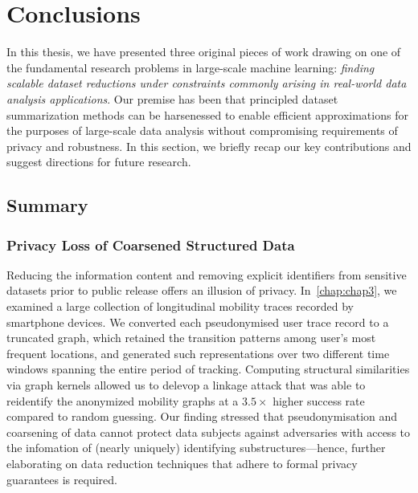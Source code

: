 \chapter{Conclusions}
\label{chap:chap6}
\renewcommand*{\MyPath}{../Chapter6}%

In this thesis, we have presented three original pieces of work drawing on one of the fundamental research problems in large-scale machine learning: \emph{finding scalable dataset reductions under constraints commonly arising in real-world data analysis applications}. Our premise has been that principled dataset summarization methods can be harsenessed to enable efficient approximations for the purposes of large-scale data analysis without compromising requirements of privacy and robustness. In this section, we briefly recap our key contributions and suggest directions for future research.

\section{Summary}
\label{sec:summary}


\subsection{Privacy Loss of Coarsened Structured Data}
\label{subsec:ch3-summary}
Reducing the information content and removing explicit identifiers from sensitive datasets prior to public release offers an illusion of privacy. In~\cref{chap:chap3}, we examined a large collection of longitudinal mobility traces recorded by smartphone devices. We converted each pseudonymised user trace record to a truncated graph, which retained the transition patterns among user's most frequent locations, and generated such representations over two different time windows spanning the entire period of tracking. Computing structural similarities via graph kernels allowed us to delevop a linkage attack that was able to reidentify the anonymized mobility graphs at a $3.5\times$ higher success rate compared to random guessing. Our finding stressed that pseudonymisation and coarsening of data cannot protect data subjects against adversaries with access to the infomation of (nearly uniquely) identifying substructures---hence, further elaborating on data reduction techniques that adhere to formal privacy guarantees is required.

